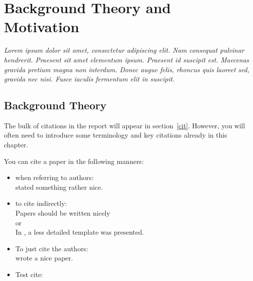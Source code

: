 \documentclass[a4paper]{book}
\begin{document}


\chapter{Background Theory and Motivation}\label{T-B}
\label{cha:TheoryAndBackground}
{\it Lorem ipsum dolor sit amet, consectetur adipiscing elit. Nam consequat pulvinar hendrerit. Praesent sit amet elementum ipsum. Praesent id suscipit est. Maecenas gravida pretium magna non interdum. Donec augue felis, rhoncus quis laoreet sed, gravida nec nisi. Fusce iaculis fermentum elit in suscipit.}


\section{Background Theory}
\label{sec:no1}

The bulk of citations in the report will appear in section~\ref{cit}. However, you will often need to introduce some terminology and key citations already in this chapter. 

You can cite a paper in the following manners: 

\begin{itemize}
\item when referring to authors:\\
 \citet{authorson10:_secon_best_paper_in_world} stated something rather nice.
\item to cite indirectly: \\
 Papers should be written nicely \citep{authorson10:_secon_best_paper_in_world}\\
or\\
In \cite{authorson10:_secon_best_paper_in_world}, a less detailed template was presented.
\item To just cite the authors: \\
\citeauthor{authorson10:_secon_best_paper_in_world} wrote a nice paper.
\item Test cite: \\
\citet{Bastien-Theano-2012}
\end{itemize}
\end{document}
